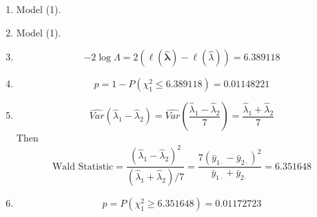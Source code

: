 \documentclass{article}
\begin{document}
\begin{enumerate}[leftmargin = 0 em, label = \arabic*., font = \bfseries]
\begin{enumerate}
		 \item 
		 Model (1).
		 \item 
		 Model (1).
		 \item 
		 \[- 2 \log \Lambda = 2 (\ell (\hat{\bm \lambda}) - \ell (\hat \lambda)) = 6.389118\]

		 \item 
		 \[ p = 1 - P(\chi_{1}^2 \leq 6.389118) = 0.01148221\]

		 \item 
		 \[\hat{Var}(\hat{\lambda}_1 - \hat{\lambda}_2) = \hat{Var}\left(\frac{\hat{\lambda}_1 - \hat{\lambda}_2}{7}\right) = \frac{\hat{\lambda}_1 + \hat{\lambda}_2}{7}\]
		 Then
		 \[\textrm{Wald Statistic} = \frac{(\hat{\lambda}_1 - \hat{\lambda}_2)^2}{(\hat{\lambda}_1 + \hat{\lambda}_2)/7} = \frac{7 (\bar{y}_{1 \cdot} - \bar{y}_{2 \cdot})^2}{\bar{y}_{1 \cdot} + \bar{y}_{2 \cdot}} = 6.351648\]
		 \item 
		 \[ p = P(\chi_{1}^2 \geq 6.351648 )= 0.01172723\]
		 
		  
	\end{enumerate}
	
	
	
	
	     
\end{enumerate}
	      
\end{document}
